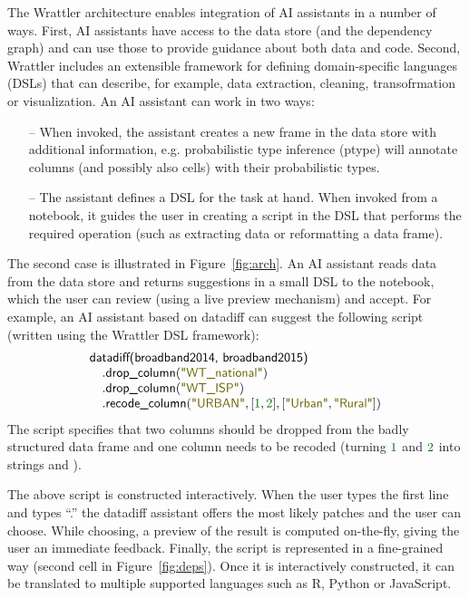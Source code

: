 \documentclass[sigplan,preprint,10pt]{acmart}\settopmatter{printfolios=true,printccs=false,printacmref=false}
\theoremstyle{plain}
\theoremstyle{definition}
\newcommand{\num}[1]{\textcolor{numclr}{#1}}
\newcommand{\str}[1]{\textnormal{\textcolor{strclr}{\sffamily "#1"}}}
\newcommand{\ident}[1]{\textnormal{\sffamily #1}}
\begin{document}
The Wrattler architecture enables integration of AI assistants in a number of ways. First, AI
assistants have access to the data store (and the dependency graph) and can use those to provide
guidance about both data and code. Second, Wrattler includes an extensible framework for defining
domain-specific languages (DSLs) that can describe, for example, data extraction, cleaning, transofrmation or 
visualization. An AI assistant can work in two ways:
%
\begin{itemize}
\item[--] When invoked, the assistant creates a new frame in the data store with additional
  information, e.g. probabilistic type inference (ptype) will annotate columns (and possibly
  also cells) with their probabilistic types.
\vspace{0.25em}
\item[--] The assistant defines a DSL for the task at hand. When invoked from a notebook,
  it guides the user in creating a script in the DSL that performs the required operation
  (such as extracting data or reformatting a data frame).
\end{itemize}
%
The second case is illustrated in Figure~\ref{fig:arch}. An AI assistant reads data from the data
store and returns suggestions in a small DSL to the notebook, which the user can review 
(using a live preview mechanism) and accept. For example, an AI
assistant based on datadiff can suggest the following script (written using the Wrattler DSL
framework):
%
\begin{equation*}
\begin{array}{l}
\ident{datadiff(broadband2014, broadband2015)}\\
\quad.\ident{drop\_column}(\str{WT\_national})\\
\quad.\ident{drop\_column}(\str{WT\_ISP})\\
\quad.\ident{recode\_column}(\str{URBAN}, [\num{1}, \num{2}], [\str{Urban},\str{Rural}])
\end{array}  
\end{equation*}
%
The script specifies that two columns should be dropped from the badly structured data frame and
one column needs to be recoded (turning $\num{1}$ and $\num{2}$ into strings
 and ).

The above script is constructed interactively. When the user types the first line and types
``.'' the datadiff assistant offers the most likely patches and the user can choose. While
choosing, a preview of the result is computed on-the-fly, giving the user an immediate feedback.
Finally, the script is represented in a fine-grained way (second cell in Figure~\ref{fig:deps}).
Once it is interactively constructed, it can be translated to multiple supported languages
such as R, Python or JavaScript.
\end{document}
